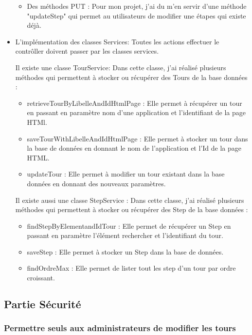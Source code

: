 \documentclass[12pt]{article}
\begin{document}
\begin{itemize}
\begin{itemize}
\item Des méthodes PUT : Pour mon projet, j'ai du m’en servir  d'une méthode "updateStep" qui permet au utilisateurs de modifier une étapes qui existe déjà.

\end{itemize}
\item L'implémentation des classes Services: Toutes les actions effectuer le contrôller doivent passer par les classes services. 

Il existe une classe TourService: Dans cette classe, j'ai réalisé plusieurs méthodes qui permettent à stocker ou récupérer des Tours de la base données : 
\begin{itemize}
\item  retrieveTourByLibelleAndIdHtmlPage : Elle permet à récupérer un tour en passant en paramètre nom d'une application et l'identifiant de la page HTMl. 

\item saveTourWithLibelleAndIdHtmlPage : Elle permet à stocker un tour dans la base de données en donnant le nom de l'application et l'Id de la page HTML. 

\item updateTour : Elle permet à modifier un tour existant dans la base données en donnant des nouveaux paramètres. 
\end{itemize}

Il existe aussi une classe StepService : Dans cette classe, j'ai réalisé plusieurs méthodes qui permettent à stocker ou récupérer des Step de la base données : 
\begin{itemize}

\item  findStepByElementandIdTour : Elle permet de récupérer un Step en passant en paramètre l'élément rechercher et l'identifiant du tour.

\item saveStep : Elle permet à stocker un Step dans la base de données.

\item findOrdreMax : Elle permet de lister tout les step d'un tour par ordre croissant.  
\end{itemize}
\end{itemize}
\newpage
\subsection{Partie Sécurité}
\subsubsection{Permettre seuls aux administrateurs de modifier les tours}
\end{document}

